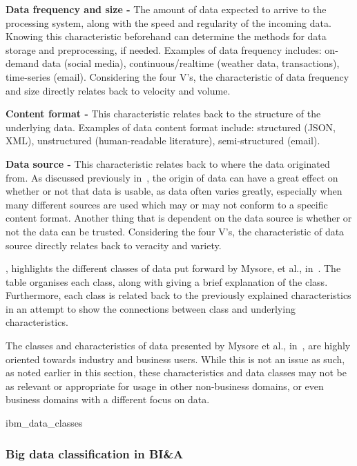 \noindent \textbf{Data frequency and size -} The amount of data expected to arrive to the processing system, along with
the speed and regularity of the incoming data. Knowing this characteristic beforehand can determine the methods for data
storage and preprocessing, if needed. Examples of data frequency includes: on-demand data (social media),
continuous/realtime (weather data, transactions), time-series (email). Considering the four V's, the characteristic of
data frequency and size directly relates back to velocity and volume.

\noindent \textbf{Content format -} This characteristic relates back to the structure of the underlying data. Examples
of data content format include: structured (JSON, XML), unstructured (human-readable literature), semi-structured
(email).

\noindent \textbf{Data source -} This characteristic relates back to where the data originated from. As discussed
previously in~, the origin of data can have a great effect on whether or not that data is usable, as
data often varies greatly, especially when many different sources are used which may or may  not conform to a specific
content format. Another thing that is dependent on the data source is whether or not the data can be trusted.
Considering the four V's, the characteristic of data source directly relates back to veracity and variety.

, highlights the different classes of data put forward by Mysore, et al.,
in~\cite{ibm_big_2013}. The table organises each class, along with giving a brief explanation of the class. Furthermore,
each class is related back to the previously explained characteristics in an attempt to show the connections between
class and underlying characteristics.

The classes and characteristics of data presented by Mysore et al., in~\cite{ibm_big_2013}, are highly oriented towards
industry and business users. While this is not an issue as such, as noted earlier in this section, these characteristics
and data classes may not be as relevant or appropriate for usage in other non-business domains, or even business domains
with a different focus on data.

{ibm_data_classes}



\subsubsection{Big data classification in BI\&A} %
\label{ssub:big_data_BIA}

